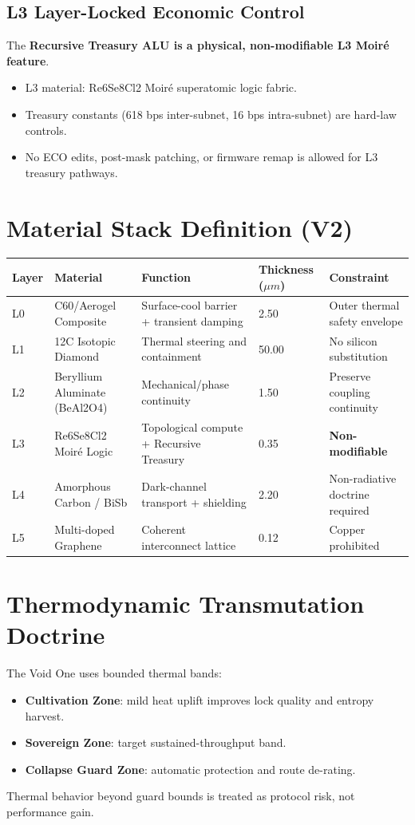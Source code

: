 \documentclass[11pt]{article}
\begin{document}
\subsection{L3 Layer-Locked Economic Control}
The \textbf{Recursive Treasury ALU is a physical, non-modifiable L3 Moir\'e feature}.
\begin{itemize}
  \item L3 material: Re6Se8Cl2 Moir\'e superatomic logic fabric.
  \item Treasury constants (618 bps inter-subnet, 16 bps intra-subnet) are hard-law controls.
  \item No ECO edits, post-mask patching, or firmware remap is allowed for L3 treasury pathways.
\end{itemize}

\section{Material Stack Definition (V2)}
\begin{longtable}{@{}lllll@{}}
\toprule
Layer & Material & Function & Thickness (\(\mu m\)) & Constraint \\
\midrule
\endhead
L0 & C60/Aerogel Composite & Surface-cool barrier + transient damping & 2.50 & Outer thermal safety envelope \\
L1 & 12C Isotopic Diamond & Thermal steering and containment & 50.00 & No silicon substitution \\
L2 & Beryllium Aluminate (BeAl2O4) & Mechanical/phase continuity & 1.50 & Preserve coupling continuity \\
L3 & Re6Se8Cl2 Moir\'e Logic & Topological compute + Recursive Treasury & 0.35 & \textbf{Non-modifiable} \\
L4 & Amorphous Carbon / BiSb & Dark-channel transport + shielding & 2.20 & Non-radiative doctrine required \\
L5 & Multi-doped Graphene & Coherent interconnect lattice & 0.12 & Copper prohibited \\
\bottomrule
\end{longtable}

\section{Thermodynamic Transmutation Doctrine}
The Void One uses bounded thermal bands:
\begin{itemize}
  \item \textbf{Cultivation Zone}: mild heat uplift improves lock quality and entropy harvest.
  \item \textbf{Sovereign Zone}: target sustained-throughput band.
  \item \textbf{Collapse Guard Zone}: automatic protection and route de-rating.
\end{itemize}
Thermal behavior beyond guard bounds is treated as protocol risk, not performance gain.
\end{document}

